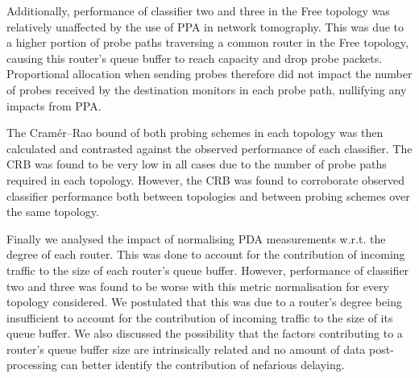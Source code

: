 Additionally, performance of classifier two and three in the Free topology was relatively unaffected by the use of PPA in network tomography. This was due to a higher portion of probe paths traversing a common router in the Free topology, causing this router's queue buffer to reach capacity and drop probe packets. Proportional allocation when sending probes therefore did not impact the number of probes received by the destination monitors in each probe path, nullifying any impacts from PPA.\par
The Cramér–Rao bound of both probing schemes in each topology was then calculated and contrasted against the observed performance of each classifier. The CRB was found to be very low in all cases due to the number of probe paths required in each topology. However, the CRB was found to corroborate observed classifier performance both between topologies and between probing schemes over the same topology.\par
Finally we analysed the impact of normalising PDA measurements w.r.t. the degree of each router. This was done to account for the contribution of incoming traffic to the size of each router's queue buffer. However, performance of classifier two and three was found to be worse with this metric normalisation for every topology considered. We postulated that this was due to a router's degree being insufficient to account for the contribution of incoming traffic to the size of its queue buffer. We also discussed the possibility that the factors contributing to a router's queue buffer size are intrinsically related and no amount of data post-processing can better identify the contribution of nefarious delaying.